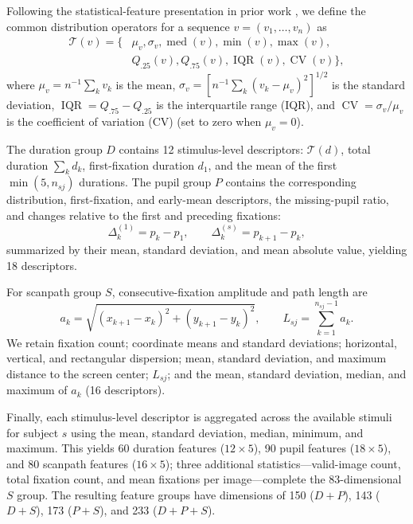 \documentclass[conference,a4paper]{IEEEtran}
\begin{document}
Following the statistical-feature presentation in prior work \cite{vu2026comparative}, we define the common distribution operators for a sequence $v=(v_1,\ldots,v_n)$ as
\begin{equation}
\begin{aligned}
\mathcal{T}(v)=\{&\mu_v,\sigma_v,\operatorname{med}(v),\min(v),\max(v),\\
&Q_{.25}(v),Q_{.75}(v),\operatorname{IQR}(v),\operatorname{CV}(v)\},
\end{aligned}
\label{eq:distribution_features}
\end{equation}
where $\mu_v=n^{-1}\sum_k v_k$ is the mean, $\sigma_v=[n^{-1}\sum_k(v_k-\mu_v)^2]^{1/2}$ is the standard deviation, $\operatorname{IQR}=Q_{.75}-Q_{.25}$ is the interquartile range (IQR), and $\operatorname{CV}=\sigma_v/\mu_v$ is the coefficient of variation (CV) (set to zero when $\mu_v=0$).

The duration group $D$ contains 12 stimulus-level descriptors: $\mathcal{T}(d)$, total duration $\sum_k d_k$, first-fixation duration $d_1$, and the mean of the first $\min(5,n_{sj})$ durations. The pupil group $P$ contains the corresponding distribution, first-fixation, and early-mean descriptors, the missing-pupil ratio, and changes relative to the first and preceding fixations:
\begin{equation}
\Delta_k^{(1)}=p_k-p_1,\qquad \Delta_k^{(s)}=p_{k+1}-p_k,
\label{eq:pupil_changes}
\end{equation}
summarized by their mean, standard deviation, and mean absolute value, yielding 18 descriptors.

For scanpath group $S$, consecutive-fixation amplitude and path length are
\begin{equation}
a_k=\sqrt{(x_{k+1}-x_k)^2+(y_{k+1}-y_k)^2},\qquad L_{sj}=\sum_{k=1}^{n_{sj}-1}a_k.
\label{eq:scanpath}
\end{equation}
We retain fixation count; coordinate means and standard deviations; horizontal, vertical, and rectangular dispersion; mean, standard deviation, and maximum distance to the screen center; $L_{sj}$; and the mean, standard deviation, median, and maximum of $a_k$ (16 descriptors).

Finally, each stimulus-level descriptor is aggregated across the available stimuli for subject $s$ using the mean, standard deviation, median, minimum, and maximum. This yields 60 duration features ($12\times5$), 90 pupil features ($18\times5$), and 80 scanpath features ($16\times5$); three additional statistics—valid-image count, total fixation count, and mean fixations per image—complete the 83-dimensional $S$ group. The resulting feature groups have dimensions of 150 ($D+P$), 143 ($D+S$), 173 ($P+S$), and 233 ($D+P+S$).
\end{document}
